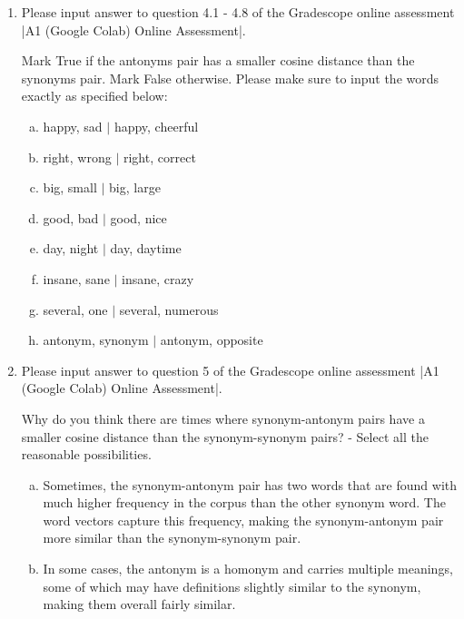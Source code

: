 \begin{enumerate}[1.]

\item {}

Please input answer to question 4.1 - 4.8 of the Gradescope online assessment |A1 (Google Colab) Online Assessment|.

Mark True if the antonyms pair has a smaller cosine distance than the synonyms pair. Mark False otherwise. Please make sure to input the words exactly as specified below: 
\begin{enumerate}[a.]
\item \textsf{happy, sad $\vert$ happy, cheerful}
\item \textsf{right, wrong $\vert$ right, correct}
\item \textsf{big, small $\vert$ big, large}
\item \textsf{good, bad $\vert$ good, nice}
\item \textsf{day, night $\vert$ day, daytime}
\item \textsf{insane, sane $\vert$ insane, crazy}
\item \textsf{several, one $\vert$ several, numerous}
\item \textsf{antonym, synonym $\vert$ antonym, opposite}
\end{enumerate}


\item {}

Please input answer to question 5 of the Gradescope online assessment |A1 (Google Colab) Online Assessment|.

Why do you think there are times where synonym-antonym pairs have a smaller cosine distance than the synonym-synonym pairs? - Select all the reasonable possibilities.

\begin{enumerate}[a.]
\item Sometimes, the synonym-antonym pair has two words that are found with much higher frequency in the corpus than the other synonym word. The word vectors capture this frequency, making the synonym-antonym pair more similar than the synonym-synonym pair.

\item In some cases, the antonym is a homonym and carries multiple meanings, some of which may have definitions slightly similar to the synonym, making them overall fairly similar.


\end{enumerate}
\end{enumerate}
